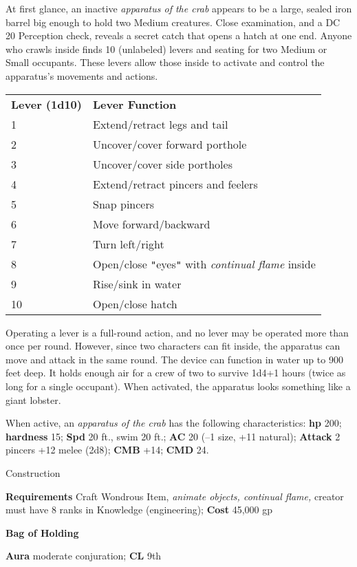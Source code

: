 At first glance, an inactive \textit{apparatus of the crab} appears to be a large, sealed iron barrel big enough to hold two Medium creatures. Close examination, and a DC 20 Perception check, reveals a secret catch that opens a hatch at one end. Anyone who crawls inside finds 10 (unlabeled) levers and seating for two Medium or Small occupants. These levers allow those inside to activate and control the apparatus's movements and actions.
\begin{tabular}{ll}
\textbf{Lever (1d10)} & \textbf{Lever Function}\\
1 & Extend/retract legs and tail\\
2 & Uncover/cover forward porthole\\
3 & Uncover/cover side portholes\\
4 & Extend/retract pincers and feelers\\
5 & Snap pincers\\
6 & Move forward/backward\\
7 & Turn left/right\\
8 & Open/close \texttt{{}"{}}eyes\texttt{{}"{}} with \textit{continual flame }inside\\
9 & Rise/sink in water\\
10 & Open/close hatch\\
\end{tabular}

				
Operating a lever is a full-round action, and no lever may be operated more than once per round. However, since two characters can fit inside, the apparatus can move and attack in the same round. The device can function in water up to 900 feet deep. It holds enough air for a crew of two to survive 1d4+1 hours (twice as long for a single occupant). When activated, the apparatus looks something like a giant lobster.
				
When active, an \textit{apparatus of the crab} has the following characteristics: \textbf{hp} 200; \textbf{hardness} 15; \textbf{Spd} 20 ft., swim 20 ft.; \textbf{AC} 20 (--1 size, +11 natural); \textbf{Attack} 2 pincers +12 melee (2d8); \textbf{CMB }+14; \textbf{CMD} 24.
				
Construction
				
\textbf{Requirements} Craft Wondrous Item, \textit{animate objects, continual flame, }creator must have 8 ranks in Knowledge (engineering); \textbf{Cost }45,000 gp
				
\textbf{Bag of Holding}
				
\textbf{Aura} moderate conjuration;\textbf{ CL }9th
				
